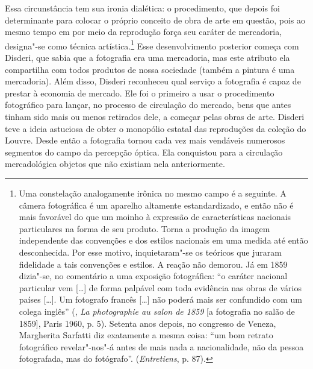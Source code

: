 Essa circunstância tem sua ironia dialética: o procedimento, que depois
foi determinante para colocar o próprio conceito de obra de arte
em questão, pois ao mesmo tempo em por meio da reprodução força seu
caráter de mercadoria, designa"-se como técnica artística.\footnote{Uma
  constelação analogamente irônica no mesmo campo é a seguinte. A câmera
  fotográfica é um aparelho altamente estandardizado, e então não é mais
  favorável do que um moinho à expressão de características nacionais
  particulares na forma de seu produto. Torna a produção da imagem
  independente das convenções e dos estilos nacionais em uma medida até
  então desconhecida. Por esse motivo, inquietaram"-se os teóricos que
  juraram fidelidade a tais convenções e estilos. A reação não demorou.
  Já em 1859 dizia"-se, no comentário a uma exposição fotográfica: ``o
  caráter nacional particular vem {[}\ldots{}{]} de forma palpável com toda
  evidência nas obras de vários países {[}\ldots{}{]}. Um fotografo francês
  {[}\ldots{}{]} não poderá mais ser confundido com um colega inglês'' (, \emph{La photographie au salon de 1859} {[}a fotografia no
  salão de 1859{]}, Paris 1960, p. 5). Setenta anos depois, no congresso
  de Veneza, Margherita Sarfatti diz exatamente a mesma coisa: ``um bom
  retrato fotográfico revelar"-nos"-á antes de mais nada a nacionalidade,
  não da pessoa fotografada, mas do fotógrafo''. (\emph{Entretiens}, p. 87).}
Esse desenvolvimento posterior começa com Disderi, que sabia que a
fotografia era uma mercadoria, mas este atributo ela compartilha com
todos produtos de nossa sociedade (também a pintura é uma mercadoria).
Além disso, Disderi reconheceu qual serviço a fotografia é capaz de
prestar à economia de mercado. Ele foi o primeiro a usar o procedimento
fotográfico para lançar, no processo de circulação do mercado, bens que antes tinham
sido mais ou menos retirados dele, a começar pelas obras de
arte. Disderi teve a ideia astuciosa de obter o monopólio estatal das
reproduções da coleção do Louvre. Desde então a fotografia tornou cada vez mais vendáveis
numerosos segmentos do campo da percepção óptica. Ela
conquistou para a circulação mercadológica objetos que não
existiam nela anteriormente.

